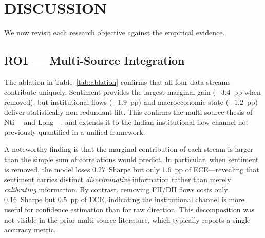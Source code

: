 \begin{table}[t]
\centering
\caption{Cross-market transfer to S\&P~500 subset, 2024 holdout (RO4).
MDD = maximum drawdown.}
\label{tab:transfer}
\end{table}


\section{DISCUSSION}
\label{sec:discussion}

We now revisit each research objective against the empirical evidence.

\subsection{RO1 --- Multi-Source Integration}

The ablation in Table~\ref{tab:ablation} confirms that all four data
streams contribute uniquely. Sentiment provides the largest marginal gain
($-3.4$~pp when removed), but institutional flows ($-1.9$~pp) and
macroeconomic state ($-1.2$~pp) deliver statistically non-redundant lift.
This confirms the multi-source thesis of Nti~\etal~\cite{nti2021multisource}
and Long~\etal~\cite{long2024hybrid}, and extends it to the Indian
institutional-flow channel not previously quantified in a unified framework.

A noteworthy finding is that the marginal contribution of each stream is
larger than the simple sum of correlations would predict. In particular,
when sentiment is removed, the model loses 0.27~Sharpe but only 1.6~pp of
ECE---revealing that sentiment carries distinct \emph{discriminative}
information rather than merely \emph{calibrating} information. By contrast,
removing FII/DII flows costs only 0.16~Sharpe but 0.5~pp of ECE,
indicating the institutional channel is more useful for confidence
estimation than for raw direction. This decomposition was not visible in
the prior multi-source literature, which typically reports a single
accuracy metric.

